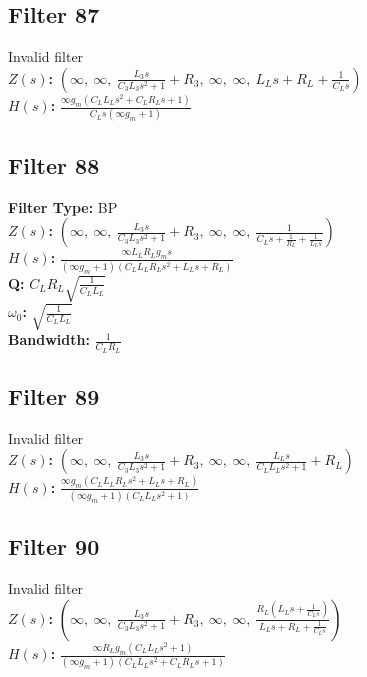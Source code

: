 \documentclass{article}
\begin{document}
\subsection*{Filter 87}
Invalid filter \\ 
\textbf{$Z(s)$:} $\left( \infty, \  \infty, \  \frac{L_{3} s}{C_{3} L_{3} s^{2} + 1} + R_{3}, \  \infty, \  \infty, \  L_{L} s + R_{L} + \frac{1}{C_{L} s}\right)$ \\ 
\textbf{$H(s)$:} $\frac{\infty g_{m} \left(C_{L} L_{L} s^{2} + C_{L} R_{L} s + 1\right)}{C_{L} s \left(\infty g_{m} + 1\right)}$ \\ 
\subsection*{Filter 88}
\textbf{Filter Type:} BP \\ 
\textbf{$Z(s)$:} $\left( \infty, \  \infty, \  \frac{L_{3} s}{C_{3} L_{3} s^{2} + 1} + R_{3}, \  \infty, \  \infty, \  \frac{1}{C_{L} s + \frac{1}{R_{L}} + \frac{1}{L_{L} s}}\right)$ \\ 
\textbf{$H(s)$:} $\frac{\infty L_{L} R_{L} g_{m} s}{\left(\infty g_{m} + 1\right) \left(C_{L} L_{L} R_{L} s^{2} + L_{L} s + R_{L}\right)}$ \\ 
\textbf{Q:} $C_{L} R_{L} \sqrt{\frac{1}{C_{L} L_{L}}}$ \\ 
\textbf{$\omega_0$:} $\sqrt{\frac{1}{C_{L} L_{L}}}$ \\ 
\textbf{Bandwidth:} $\frac{1}{C_{L} R_{L}}$ \\ 
\subsection*{Filter 89}
Invalid filter \\ 
\textbf{$Z(s)$:} $\left( \infty, \  \infty, \  \frac{L_{3} s}{C_{3} L_{3} s^{2} + 1} + R_{3}, \  \infty, \  \infty, \  \frac{L_{L} s}{C_{L} L_{L} s^{2} + 1} + R_{L}\right)$ \\ 
\textbf{$H(s)$:} $\frac{\infty g_{m} \left(C_{L} L_{L} R_{L} s^{2} + L_{L} s + R_{L}\right)}{\left(\infty g_{m} + 1\right) \left(C_{L} L_{L} s^{2} + 1\right)}$ \\ 
\subsection*{Filter 90}
Invalid filter \\ 
\textbf{$Z(s)$:} $\left( \infty, \  \infty, \  \frac{L_{3} s}{C_{3} L_{3} s^{2} + 1} + R_{3}, \  \infty, \  \infty, \  \frac{R_{L} \left(L_{L} s + \frac{1}{C_{L} s}\right)}{L_{L} s + R_{L} + \frac{1}{C_{L} s}}\right)$ \\ 
\textbf{$H(s)$:} $\frac{\infty R_{L} g_{m} \left(C_{L} L_{L} s^{2} + 1\right)}{\left(\infty g_{m} + 1\right) \left(C_{L} L_{L} s^{2} + C_{L} R_{L} s + 1\right)}$ \\ 
\end{document}
